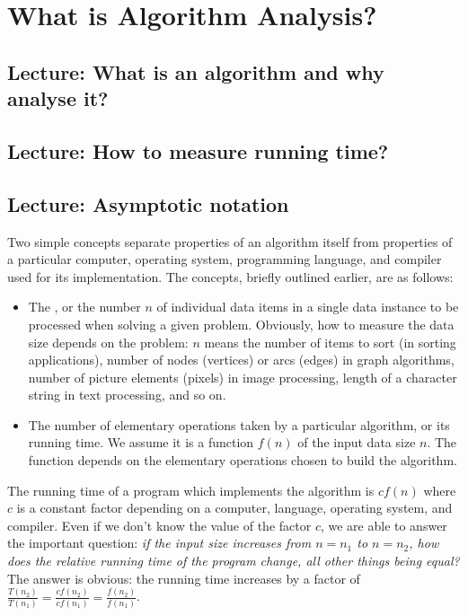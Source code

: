 \part{What is Algorithm Analysis?} \label{ch:alganal}

\chapter{Lecture: What is an algorithm and why analyse it?}

\chapter{Lecture: How to measure running time?}

\chapter{Lecture: Asymptotic notation}

Two simple concepts separate properties of an algorithm itself from
properties of a particular computer, operating system, programming
language, and compiler used for its implementation. The concepts,
briefly outlined earlier, are as follows: 
\begin{itemize}
 \item The , or
the number $n$ of individual data items in a single data instance to be
processed when solving a given problem. Obviously, how to measure the data
size depends on the problem: \(n\) means the number of items to sort (in sorting
applications),
number of nodes (vertices) or arcs (edges) in graph algorithms, number
of picture elements (pixels) in image processing, length of a character
string in text processing, and so on.  
\item The number of elementary operations taken by a particular algorithm, or its
running time. We assume it is a function $f(n)$ of the input data size
$n$. The function depends on the elementary operations chosen to build the
algorithm. 
\end{itemize} 

The running time of a program which implements
the algorithm is $c  f(n)$ where $c$ is a constant factor depending
on a computer, language, operating system, and compiler. Even if we don't know 
the value of the factor \(c\), we are able to answer the important question:
\emph{if the input size increases from $n=n_{1}$ to $n=n_{2}$, how does
the relative running time of the program change, all other things being equal?}
The answer is obvious: the 
running time increases by a factor of 
\( 
\frac{T(n_{2})}{T(n_{1})} = 
\frac{c  f(n_{2})}{c  f(n_{1})} =  
\frac{f(n_{2})}{f(n_{1})}
\). 

